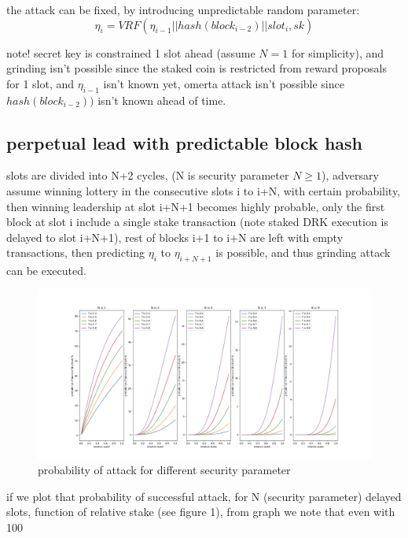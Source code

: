 \documentclass{article}
\begin{document}
the attack can be fixed, by introducing unpredictable random parameter: $$\eta_i = VRF(\eta_{i-1}||hash(block_{i-2})||slot_i, sk)$$


note! secret key is constrained 1 slot ahead (assume $N=1$ for simplicity), and grinding isn't possible since the staked coin is restricted from reward proposals for 1 slot, and $\eta_{i-1}$ isn't known yet, omerta attack isn't possible since $hash(block_{i-2}))$ isn't known ahead of time.

\subsection {perpetual lead with predictable block hash}



slots are divided into N+2 cycles, (N is security parameter $N \ge 1$), adversary assume winning lottery in the consecutive slots i to i+N, with certain probability, then winning leadership at slot i+N+1 becomes highly probable, only the first block at slot i include a single stake transaction (note staked DRK execution is delayed to slot i+N+1), rest of blocks i+1 to i+N are left with empty transactions, then predicting $\eta_i$ to $\eta_{i+N+1}$ is possible, and thus grinding attack can be executed.

\begin{figure}
  \includegraphics[width=1.2\textwidth,right]{prob.png}
  \caption{probability of attack for different security parameter}
\end{figure}


if we plot that probability of successful attack, for N (security parameter) delayed slots, function of relative stake (see figure 1), from graph we  note that even with 100%
\end{document}

